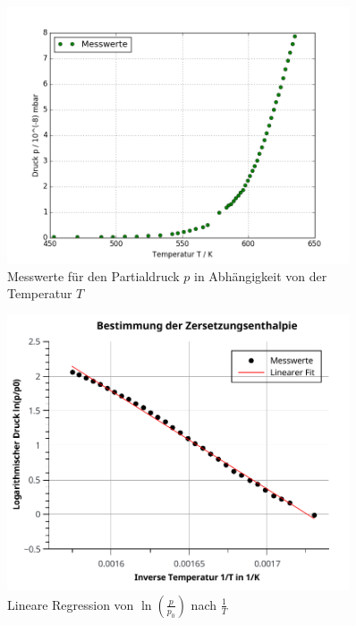 \begin{figure}[tb]
	\centering\includegraphics[width=0.9\textwidth]{fig/massen_a6_1.png}
	\caption{Messwerte für den Partialdruck $p$ in Abhängigkeit von der Temperatur $T$}
	\label{fig:v61}
\end{figure}

\begin{figure}[tb]
	\centering\includegraphics[width=0.9\textwidth]{fig/massen_a6_reg.pdf}
	\caption{Lineare Regression von $\ln\left(\frac{p}{p_{0}}\right)$ nach $\frac{1}{T}$}
	\label{fig:v62}
\end{figure}






